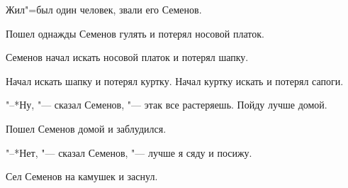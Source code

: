 
Жил"=был один человек, звали его Семенов.
    
Пошел  однажды  Семенов гулять и потерял
носовой платок.
    
Семенов  начал  искать  носовой платок и
потерял шапку.
    
Начал искать шапку и потерял куртку. Начал 
куртку искать и потерял сапоги.
    
"--*Ну, "--- сказал Семенов, "---  этак все 
растеряешь. Пойду лучше домой.
    
Пошел Семенов домой и заблудился.
    
"--*Нет, "--- сказал Семенов, "---  лучше я сяду
и посижу.
    
Сел Семенов на камушек и заснул.
